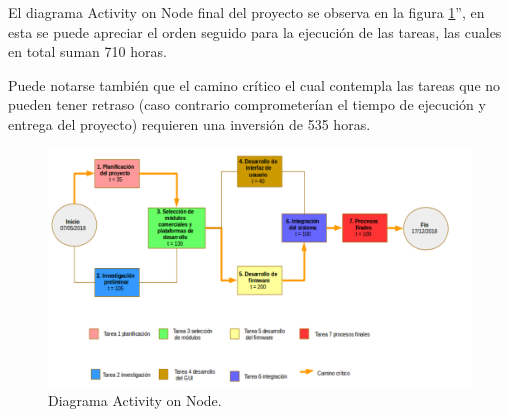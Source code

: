 El diagrama Activity on Node final del proyecto se observa en la figura \ref{fig:none}'', en esta se puede apreciar el orden seguido para la ejecución de las tareas, las cuales en total suman 710 horas.

Puede notarse también que el camino crítico el cual contempla las tareas que no pueden tener retraso (caso contrario comprometerían el tiempo de ejecución y entrega del proyecto) requieren una inversión de 535 horas.

\begin{figure}[h]
	\centering
	\includegraphics[scale=.35]{./Figures/none.png}
	\caption{Diagrama Activity on Node.}
	\label{fig:none}
\end{figure}





